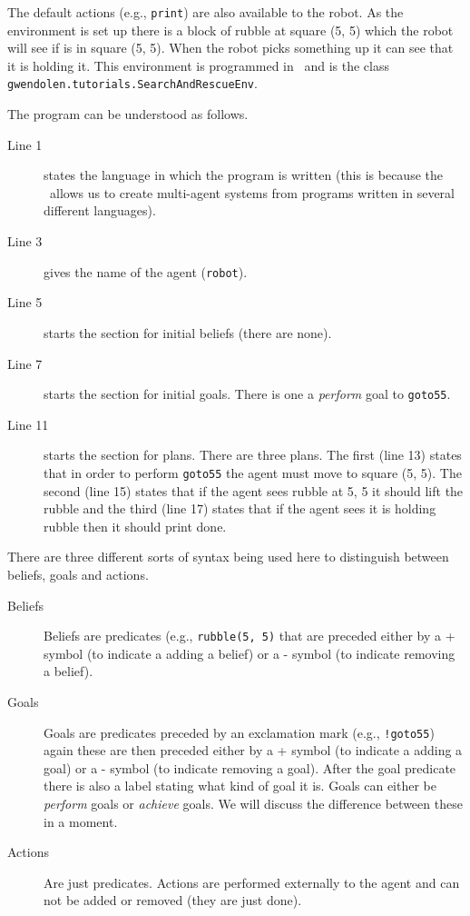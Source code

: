 The default actions
(e.g., \lstinline{print}) are also available to the robot.  As the
environment is set up there is a block of rubble at
square (5, 5) which the robot will see if is in square (5, 5).  When
the robot picks something up it can see that it is holding it.  This
environment is programmed in \java\ and is the
class \lstinline{gwendolen.tutorials.SearchAndRescueEnv}.

The program can be understood as follows.  
\begin{description}
\item[Line 1] states the language in which the program is written (this is because the \ail\ allows us to create multi-agent systems from programs written in several different languages).  
\item[Line 3] gives the name of the agent (\lstinline{robot}).  
\item[Line 5] starts the section for initial beliefs (there are none).  
\item[Line 7] starts the section for initial goals.  There is one a \emph{perform} goal to \lstinline{goto55}.
\item[Line 11] starts the section for plans.  There are
  three plans.  The first (line 13) states that in order to
  perform \lstinline{goto55} the agent
  must move to square (5, 5).  The second (line 15) states that if the
  agent sees rubble at 5, 5 it should lift the rubble and the third
  (line 17) states that if the agent sees it is holding rubble then it
  should print done.
\end{description}

There are three different sorts of syntax being used here to
distinguish between beliefs, goals and
actions.

\begin{description}
\item[Beliefs] Beliefs are predicates (e.g.,
  \lstinline{rubble(5, 5)} that are preceded either by a + symbol (to
  indicate a adding a belief) or a - symbol (to
  indicate removing a belief).
\item[Goals] Goals are predicates preceded by an
  exclamation mark (e.g., \lstinline{!goto55}) again these are then
  preceded either by a + symbol (to indicate a adding a
  goal) or a - symbol (to indicate removing a
  goal).  After the goal predicate there is also a
  label stating what kind of goal it is.  Goals can either be
  \emph{perform} goals or
  \emph{achieve} goals.  We will discuss the
  difference between these in a moment.
\item[Actions] Are just predicates.  Actions are
  performed externally to the agent and can not be added or removed
  (they are just done).
\end{description}

